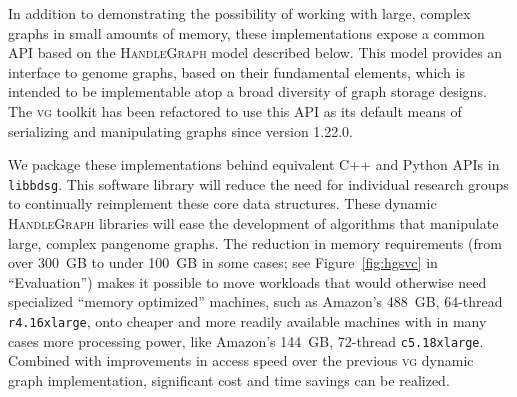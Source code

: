 \documentclass{bioinfo}
\begin{document}
In addition to demonstrating the possibility of working with large, complex graphs in small amounts of memory, these implementations expose a common API based on the \textsc{HandleGraph} model described below.
This model provides an interface to genome graphs, based on their fundamental elements, which is intended to be implementable atop a broad diversity of graph storage designs.
The \textsc{vg} toolkit has been refactored to use this API as its default means of serializing and manipulating graphs since version 1.22.0. 

We package these implementations behind equivalent C++ and Python APIs in \texttt{libbdsg}.
This software library will reduce the need for individual research groups to continually reimplement these core data structures.
These dynamic \textsc{HandleGraph} libraries will ease the development of algorithms that manipulate large, complex pangenome graphs.
The reduction in memory requirements (from over 300~GB to under 100~GB in some cases; see Figure~\ref{fig:hgsvc} in ``Evaluation'') makes it possible to move workloads that would otherwise need specialized ``memory optimized'' machines, such as Amazon's 488~GB, 64-thread \texttt{r4.16xlarge}, onto cheaper and more readily available machines with in many cases more processing power, like Amazon's 144~GB, 72-thread \texttt{c5.18xlarge}.
Combined with improvements in access speed over the previous \textsc{vg} dynamic graph implementation, significant cost and time savings can be realized.
\end{document}
